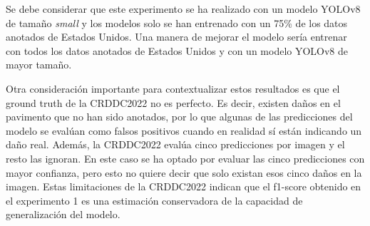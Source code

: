 \begin{table}[H]
    \centering
    \caption{F1-scores para los 10 primeros equipos en la plataforma de la CRDDC2022 para los datos de test de Estados Unidos en el momento del cierre de la competición.}
    \label{tab:top10_f1_scores}
\end{table}

Se debe considerar que este experimento se ha realizado con un modelo YOLOv8 de tamaño \textit{small} y los modelos solo se han entrenado con un 75\% de los datos anotados de Estados Unidos. Una manera de mejorar el modelo sería entrenar con todos los datos anotados de Estados Unidos y con un modelo YOLOv8 de mayor tamaño.

Otra consideración importante para contextualizar estos resultados es que el ground truth de la CRDDC2022 no es perfecto. Es decir, existen daños en el pavimento que no han sido anotados, por lo que algunas de las predicciones del modelo se evalúan como falsos positivos cuando en realidad sí están indicando un daño real. Además, la CRDDC2022 evalúa cinco predicciones por imagen y el resto las ignoran. En este caso se ha optado por evaluar las cinco predicciones con mayor confianza, pero esto no quiere decir que solo existan esos cinco daños en la imagen. Estas limitaciones de la CRDDC2022 indican que el f1-score obtenido en el experimento 1 es una estimación conservadora de la capacidad de generalización del modelo.

